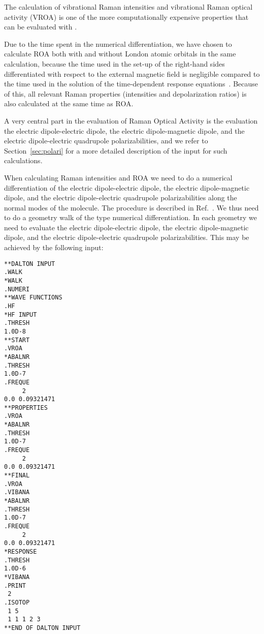 The calculation of vibrational Raman intensities and vibrational Raman optical
activity (VROA) 
is one of the more computationally expensive properties that can be
evaluated with \siraba .

Due to the time spent in the numerical differentiation, we have chosen
to calculate ROA both with and without London atomic
orbitals in the
same calculation, because the time used in the set-up of the right-hand
sides differentiated
with respect to the external magnetic field is negligible compared to
the time used in the solution of the time-dependent response
equations~\cite{thkrklbpjjofd99}. Because of this,  all relevant Raman
properties (intensities and depolarization ratios) is also calculated
at the same time as ROA.  


A very central part in the evaluation of Raman Optical Activity is the
evaluation the electric dipole-electric dipole, the electric
dipole-magnetic dipole, and the electric dipole-electric quadrupole
polarizabilities, and we refer to Section~\ref{sec:polari} for a more
detailed description of the input for such calculations.


When calculating Raman intensities and
ROA we need to do a numerical
differentiation of the electric
dipole-electric dipole, the electric 
dipole-magnetic dipole, and the electric dipole-electric quadrupole
polarizabilities along the normal modes of the
molecule. The procedure 
is described in Ref.~\cite{thkrklbpjjofd99}. We thus need to do a
geometry walk of the type numerical differentiation. In each geometry
we need to evaluate the electric dipole-electric dipole, the electric
dipole-magnetic dipole, and the electric dipole-electric quadrupole
polarizabilities. This may be achieved by the following input:

\begin{verbatim}
**DALTON INPUT
.WALK
*WALK
.NUMERI
**WAVE FUNCTIONS
.HF
*HF INPUT
.THRESH
1.0D-8
**START
.VROA
*ABALNR
.THRESH
1.0D-7
.FREQUE
     2
0.0 0.09321471
**PROPERTIES
.VROA
*ABALNR
.THRESH
1.0D-7
.FREQUE
     2
0.0 0.09321471
**FINAL
.VROA
.VIBANA
*ABALNR
.THRESH
1.0D-7
.FREQUE
     2
0.0 0.09321471
*RESPONSE
.THRESH
1.0D-6
*VIBANA
.PRINT
 2
.ISOTOP
 1 5
 1 1 1 2 3
**END OF DALTON INPUT
\end{verbatim}

